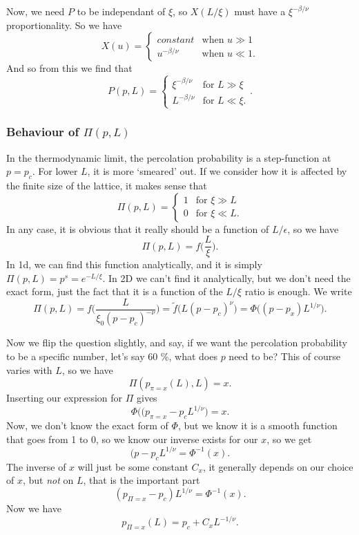 \documentclass[a4paper, 11pt, notitlepage, english]{article}
\newcommand{\eps}{\epsilon}
\begin{document}
Now, we need $P$ to be independant of $\xi$, so $X(L/\xi)$ must have a $\xi^{-\beta/\nu}$ proportionality. So we have
$$X(u) = \begin{cases}
	constant & \mbox{when } u\gg1 \\
	u^{-\beta/\nu} & \mbox{when } u\ll1.
\end{cases}$$
And so from this we find that
$$P(p,L) = \begin{cases}
	\xi^{-\beta/\nu} & \mbox{for } L \gg \xi \\
	L ^{-\beta/\nu} & \mbox{for } L \ll \xi. 
\end{cases}.$$

\subsubsection*{Behaviour of $\Pi(p, L)$}
In the thermodynamic limit, the percolation probability is a step-function at $p=p_c$. For lower $L$, it is more `smeared' out. If we consider how it is affected by the finite size of the lattice, it makes sense that 
$$\Pi(p, L) = \begin{cases}
	1 & \mbox{for } \xi \gg L \\
	0 & \mbox{for } \xi \ll L.
\end{cases}$$
In any case, it is obvious that it really should be a function of $L/\eps$, so we have
$$\Pi(p, L) = f\bigg(\frac{L}{\xi}\bigg).$$
In 1d, we can find this function analytically, and it is simply $\Pi(p, L) = p^s = e^{-L/\xi}$. In 2D we can't find it analytically, but we don't need the exact form, just the fact that it is a function of the $L/\xi$ ratio is enough. We write
$$\Pi(p, L) = f\bigg(\frac{L}{\xi_0(p-p_c)^{-\nu}}\bigg) = \tilde{f}\big(L(p-p_c)^{\nu}\big) = \Phi\big((p-p_x)L^{1/\nu}\big).$$

Now we flip the question slightly, and say, if we want the percolation probability to be a specific number, let's say 60 \%, what does $p$ need to be? This of course varies with $L$, so we have
$$\Pi(p_{\pi=x}(L), L) = x.$$
Inserting our expression for $\Pi$ gives
$$\Phi\big((p_{\pi=x}-p_c L^{1/\nu}\big) = x.$$
Now, we don't know the exact form of $\Phi$, but we know it is a smooth function that goes from 1 to 0, so we know our inverse exists for our $x$, so we get
$$(p-p_c L^{1/\nu} = \Phi^{-1}(x).$$
The inverse of $x$ will just be some constant $C_x$, it generally depends on our choice of $x$, but \emph{not} on $L$, that is the important part
$$(p_{\Pi=x}-p_c) L^{1/\nu} = \Phi^{-1}(x).$$
Now we have
$$p_{\Pi=x}(L) = p_c + C_x L^{-1/\nu}.$$
\end{document}
